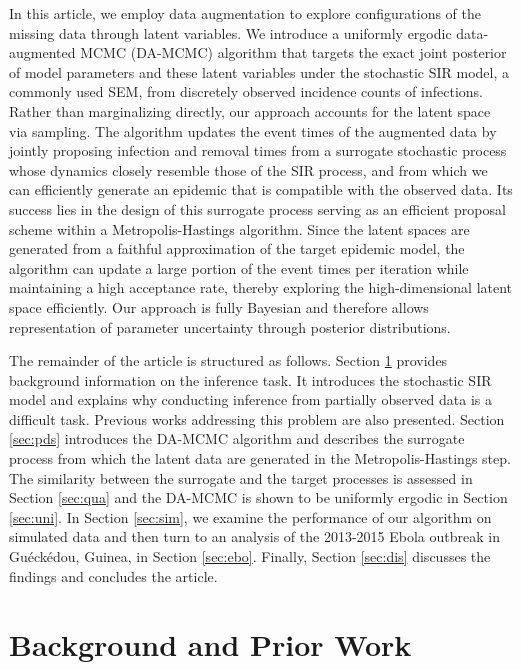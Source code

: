 \documentclass[12pt]{article}
\begin{document}
	In this article, we employ data augmentation to explore configurations of the missing data through latent variables. We introduce a uniformly ergodic data-augmented MCMC (DA-MCMC) algorithm that targets the exact joint posterior of model parameters and these latent variables under the stochastic SIR model, a commonly used SEM, from discretely observed incidence counts of infections. Rather than marginalizing directly, our approach accounts for the latent space via sampling. The algorithm updates the event times of the augmented data by jointly proposing infection and removal times from a surrogate stochastic process whose dynamics closely resemble those of the SIR process, and from which we can efficiently generate an epidemic that is compatible with the observed data. Its success lies in the design of this surrogate process serving as an efficient proposal scheme within a Metropolis-Hastings algorithm. Since the latent spaces are generated from a faithful approximation of the target epidemic model, the algorithm can update a large portion of the event times per iteration while maintaining a high acceptance rate, thereby exploring the high-dimensional latent space efficiently. Our approach is fully Bayesian and therefore allows representation of parameter uncertainty through posterior distributions.
	
	The remainder of the article is structured as follows. Section \ref{sec:set} provides background information on the inference task. It introduces the stochastic SIR model and explains why conducting inference from partially observed data is a difficult task. Previous works addressing this problem are also presented. Section \ref{sec:pds} introduces the DA-MCMC algorithm and describes the surrogate process from which the latent data are generated in the Metropolis-Hastings step. The similarity between the surrogate and the target processes is assessed in Section \ref{sec:qua} and the DA-MCMC is shown to be uniformly ergodic in Section \ref{sec:uni}. In Section \ref{sec:sim}, we examine the performance of our algorithm on simulated data and then turn to an analysis of the 2013-2015 Ebola outbreak in Gu\'eck\'edou, Guinea, in Section \ref{sec:ebo}. Finally, Section \ref{sec:dis} discusses the findings and concludes the article.
	
	\section{Background and Prior Work}
	\label{sec:set}
	
\end{document}
